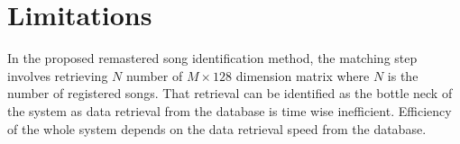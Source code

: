 \section{Limitations}

In the proposed remastered song identification method, the matching step involves retrieving
\(N\) number of \(M\times128\) dimension matrix where \(N\) is the number of registered songs.
That retrieval can be identified as the bottle neck of the system as data retrieval from the database
is time wise inefficient. Efficiency of the whole system depends on the data retrieval speed from
the database. 